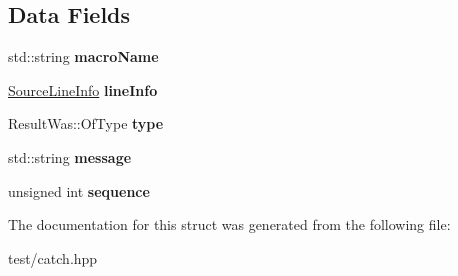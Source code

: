 \subsection*{Data Fields}
\begin{DoxyCompactItemize}
\item 
std\+::string {\bfseries macro\+Name}\hypertarget{structCatch_1_1MessageInfo_a156ade4b3cc731f6ec7b542ae47ba8e3}{}\label{structCatch_1_1MessageInfo_a156ade4b3cc731f6ec7b542ae47ba8e3}

\item 
\hyperlink{structCatch_1_1SourceLineInfo}{Source\+Line\+Info} {\bfseries line\+Info}\hypertarget{structCatch_1_1MessageInfo_a985165328723e599696ebd8e43195cc5}{}\label{structCatch_1_1MessageInfo_a985165328723e599696ebd8e43195cc5}

\item 
Result\+Was\+::\+Of\+Type {\bfseries type}\hypertarget{structCatch_1_1MessageInfo_ae928b9117465c696e45951d9d0284e78}{}\label{structCatch_1_1MessageInfo_ae928b9117465c696e45951d9d0284e78}

\item 
std\+::string {\bfseries message}\hypertarget{structCatch_1_1MessageInfo_ab6cd06e050bf426c6577502a5c50e256}{}\label{structCatch_1_1MessageInfo_ab6cd06e050bf426c6577502a5c50e256}

\item 
unsigned int {\bfseries sequence}\hypertarget{structCatch_1_1MessageInfo_a7f4f57ea21e50160adefce7b68a781d6}{}\label{structCatch_1_1MessageInfo_a7f4f57ea21e50160adefce7b68a781d6}

\end{DoxyCompactItemize}


The documentation for this struct was generated from the following file\+:\begin{DoxyCompactItemize}
\item 
test/catch.\+hpp\end{DoxyCompactItemize}
